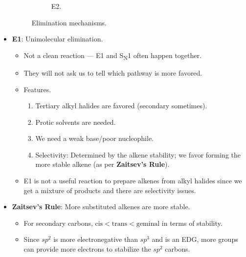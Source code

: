 \documentclass[../notes.tex]{subfiles}
\begin{document}
\begin{itemize}
\begin{figure}[h!]
\begin{subfigure}[b]{\linewidth}
                \arrow
                \+
                \+
            \schemestop
            \caption{E2.}
            \label{fig:eliminationb}
        \end{subfigure}
        \caption{Elimination mechanisms.}
        \label{fig:elimination}
    \end{figure}
    \item \textbf{E1}: Unimolecular elimination.
    \begin{itemize}
        \item Not a clean reaction --- E1 and S\textsubscript{N}1 often happen together.
        \item They will not ask us to tell which pathway is more favored.
        \item Features.
        \begin{enumerate}
            \item Tertiary alkyl halides are favored (secondary sometimes).
            \item Protic solvents are needed.
            \item We need a weak base/poor nucleophile.
            \item Selectivity: Determined by the alkene stability; we favor forming the more stable alkene (as per \textbf{Zaitsev's Rule}).
        \end{enumerate}
        \item E1 is not a useful reaction to prepare alkenes from alkyl halides since we get a mixture of products and there are selectivity issues.
    \end{itemize}
    \item \textbf{Zaitsev's Rule}: More substituted alkenes are more stable.
    \begin{itemize}
        \item For secondary carbons, $\text{cis}<\text{trans}<\text{geminal}$ in terms of stability.
        \item Since $sp^2$ is more electronegative than $sp^3$ and  is an EDG, more  groups can provide more electrons to stabilize the $sp^2$ carbons.

\end{itemize}
\end{itemize}
\end{document}
